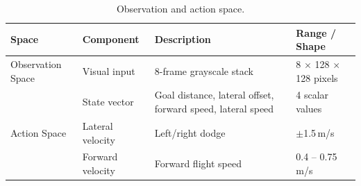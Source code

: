 \begin{table}[H]
    \small
    \centering
    \caption{Observation and action space.}
    \label{tab:obs_action}
    \begin{tabular}{p{3cm} p{3cm} p{5cm} p{3.5cm}}
        \hline\hline
        \rowcolor{lightgray}\textbf{Space} & \textbf{Component} & \textbf{Description} & \textbf{Range / Shape} \\\hline
        Observation Space & Visual input & 8-frame grayscale stack & 8 $\times$ 128 $\times$ 128 pixels \\
        \rowcolor{lightlightgray} & State vector & Goal distance, lateral offset, forward speed, lateral speed & 4 scalar values \\
        Action Space & Lateral velocity & Left/right dodge & $\pm$1.5\,m/s \\
        \rowcolor{lightlightgray} & Forward velocity & Forward flight speed & 0.4 -- 0.75\,m/s \\
        \hline
    \end{tabular}
\end{table}
